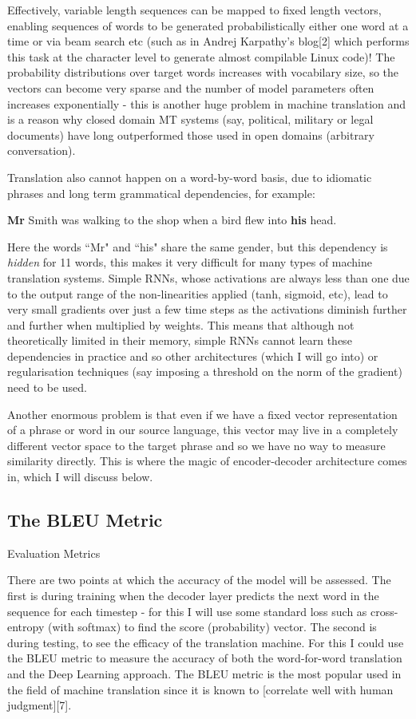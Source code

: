 \documentclass[]{article}
\begin{document}
Effectively, variable length sequences can be mapped to fixed length vectors, enabling sequences of words to be generated probabilistically either one word at a time or via beam search etc (such as in Andrej Karpathy's blog[2] which performs this task at the character level to generate almost compilable Linux code)! The probability distributions over target words increases with vocabilary size, so the vectors can become very sparse and the number of model parameters often increases exponentially - this is another huge problem in machine translation and is a reason why closed domain MT systems (say, political, military or legal documents) have long outperformed those used in open domains (arbitrary conversation). 

Translation also cannot happen on a word-by-word basis, due to idiomatic phrases and long term grammatical dependencies, for example:

{\centering
\textbf{Mr} Smith was walking to the shop when a bird flew into \textbf{his} head. \par
}


Here the words ``Mr" and ``his" share the same gender, but this dependency is \textit{hidden} for 11 words, this makes it very difficult for many types of machine translation systems. Simple RNNs, whose activations are always less than one due to the output range of the non-linearities applied (tanh, sigmoid, etc), lead to very small gradients over just a few time steps as the activations diminish further and further when multiplied by weights. This means that although not theoretically limited in their memory, simple RNNs cannot learn these dependencies in practice and so other architectures (which I will go into) or regularisation techniques (say imposing a threshold on the norm of the gradient) need to be used. 

Another enormous problem is that even if we have a fixed vector representation of a phrase or word in our source language, this vector may live in a completely different vector space to the target phrase and so we have no way to measure similarity directly. This is where the magic of encoder-decoder architecture comes in, which I will discuss below.


\subsection{The BLEU Metric}
Evaluation Metrics

There are two points at which the accuracy of the model will be assessed. The first is during training when the decoder layer predicts the next word in the sequence for each timestep - for this I will use some standard loss such as cross-entropy (with softmax) to find the score (probability) vector.
The second is during testing, to see the efficacy of the translation machine. For this I could use the BLEU metric to measure the accuracy of both the word-for-word translation and the Deep Learning approach. The BLEU metric is the most popular used in the field of machine translation since it is known to [correlate well with human judgment][7].
\end{document}
